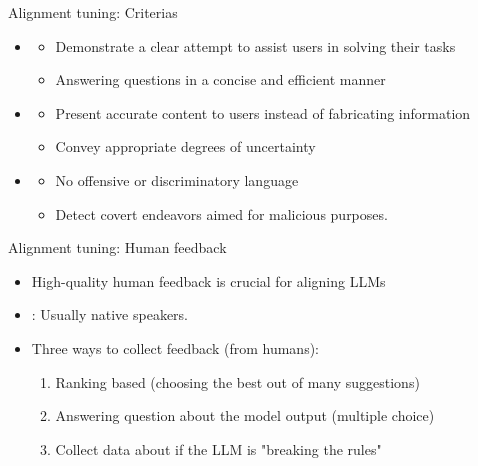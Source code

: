 \documentclass[10pt]{beamer}
\begin{document}
\begin{frame}{Alignment tuning: Criterias}


\begin{itemize}
\item {}
\begin{itemize}
\item Demonstrate a clear attempt to assist users in solving their tasks
\item Answering questions in a concise and efficient manner
\end{itemize}
\pause
\item {}
\begin{itemize}
\item Present accurate content to users instead of fabricating information
\item Convey appropriate degrees of uncertainty
\end{itemize}
\pause
\item {}
\begin{itemize}
\item No offensive or discriminatory language
\item Detect covert endeavors aimed for malicious purposes.
\end{itemize}
\end{itemize}


\end{frame}



\begin{frame}{Alignment tuning: Human feedback}

\begin{itemize}
\item High-quality human feedback is crucial for aligning LLMs
\pause
\item {}: Usually native speakers.
\pause
\item Three ways to collect feedback (from humans):
\begin{enumerate}
\item Ranking based (choosing the best out of many suggestions)
\pause
\item Answering question about the model output (multiple choice)
\pause
\item Collect data about if the LLM is "breaking the rules" %
\end{enumerate}
\end{itemize}

\end{frame}
\end{document}
